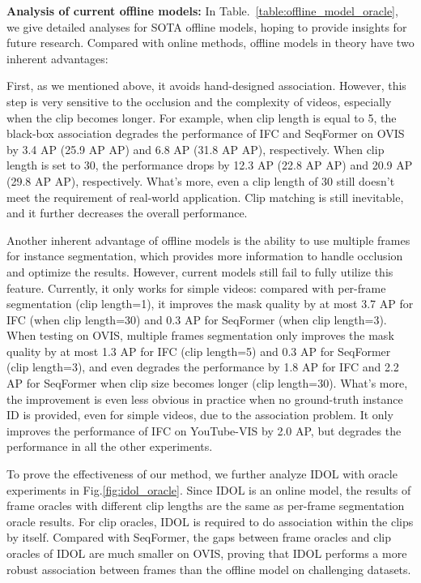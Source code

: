 \documentclass[runningheads]{llncs}
\begin{document}
\noindent\textbf{Analysis of current offline models: }
In Table.~\ref{table:offline_model_oracle}, we give detailed analyses for SOTA offline models, hoping to provide insights for future research. Compared with online methods, offline models in theory have two inherent advantages:

First, as we mentioned above, it avoids hand-designed association. However, this step is very sensitive to the occlusion and the complexity of videos, especially when the clip becomes longer. For example, when clip length is equal to 5, the black-box association degrades the performance of IFC and SeqFormer on OVIS by 3.4 AP (25.9 AP  AP) and 6.8 AP (31.8 AP  AP), respectively. When clip length is set to 30, the performance drops by 12.3 AP (22.8 AP  AP) and 20.9 AP (29.8 AP  AP), respectively. What's more, even a clip length of 30 still doesn't meet the requirement of real-world application. Clip matching is still inevitable, and it further decreases the overall performance. 





Another inherent advantage of offline models is the ability to use multiple frames for instance segmentation, which provides more information to handle occlusion and optimize the results. However, current models still fail to fully utilize this feature. Currently, it only works for simple videos: compared with per-frame segmentation (clip length=1), it improves the mask quality by at most 3.7 AP for IFC (when clip length=30) and 0.3 AP for SeqFormer (when clip length=3). When testing on OVIS, multiple frames segmentation only improves the mask quality by at most 1.3 AP for IFC (clip length=5) and 0.3 AP for SeqFormer (clip length=3), and even degrades the performance by 1.8 AP for IFC and 2.2 AP for SeqFormer when clip size becomes longer (clip length=30). What's more, the improvement is even less obvious in practice when no ground-truth instance ID is provided, even for simple videos, due to the association problem. It only improves the performance of IFC on YouTube-VIS by 2.0 AP, but degrades the performance in all the other experiments.

To prove the effectiveness of our method, we further analyze IDOL with oracle experiments in Fig.\ref{fig:idol_oracle}.
Since IDOL is an online model, the results of frame oracles with different clip lengths are the same as per-frame segmentation oracle results.
For clip oracles, IDOL is required to do association within the clips by itself.
Compared with SeqFormer, the gaps between frame oracles and clip oracles of IDOL are much smaller on OVIS, proving that IDOL performs a more robust association between frames than the offline model on challenging datasets.
\end{document}
